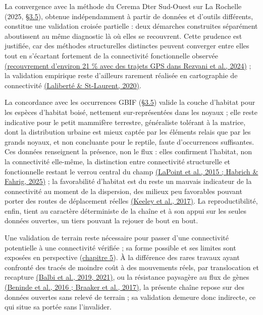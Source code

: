 \documentclass[a4paper,11pt]{report}
\begin{document}
La convergence avec la méthode du Cerema Dter Sud-Ouest sur La Rochelle (2025, \hyperref[sec:3.5]{§3.5}), obtenue indépendamment à partir de données et d'outils différents, constitue une validation croisée partielle : deux démarches construites séparément aboutissent au même diagnostic là où elles se recouvrent. Cette prudence est justifiée, car des méthodes structurelles distinctes peuvent converger entre elles tout en s'écartant fortement de la connectivité fonctionnelle observée \hyperref[sec:bibliographie]{(recouvrement d'environ 21 \% avec des trajets GPS dans Rezvani et al., 2024)} ; la validation empirique reste d'ailleurs rarement réalisée en cartographie de connectivité \hyperref[sec:bibliographie]{(Laliberté \& St-Laurent, 2020)}.

La concordance avec les occurrences GBIF (\hyperref[sec:3.5]{§3.5}) valide la couche d'habitat pour les espèces d'habitat boisé, nettement sur-représentées dans les noyaux ; elle reste indicative pour le petit mammifère terrestre, généraliste tolérant à la matrice, dont la distribution urbaine est mieux captée par les éléments relais que par les grands noyaux, et non concluante pour le reptile, faute d'occurrences suffisantes. Ces données renseignent la présence, non le flux : elles confirment l'habitat, non la connectivité elle-même, la distinction entre connectivité structurelle et fonctionnelle restant le verrou central du champ \hyperref[sec:bibliographie]{(LaPoint et al., 2015 ; Habrich \& Fahrig, 2025)} ; la favorabilité d'habitat est du reste un mauvais indicateur de la connectivité au moment de la dispersion, des milieux peu favorables pouvant porter des routes de déplacement réelles \hyperref[sec:bibliographie]{(Keeley et al., 2017)}. La reproductibilité, enfin, tient au caractère déterministe de la chaîne et à son appui sur les seules données ouvertes, un tiers pouvant la rejouer de bout en bout.

Une validation de terrain reste nécessaire pour passer d'une connectivité potentielle à une connectivité vérifiée ; sa forme possible et ses limites sont exposées en perspective (\hyperref[chap:5]{chapitre 5}). À la différence des rares travaux ayant confronté des tracés de moindre coût à des mouvements réels, par translocation et recapture \hyperref[sec:bibliographie]{(Balbi et al., 2019, 2021)}, ou la résistance paysagère au flux de gènes \hyperref[sec:bibliographie]{(Beninde et al., 2016 ; Braaker et al., 2017)}, la présente chaîne repose sur des données ouvertes sans relevé de terrain ; sa validation demeure donc indirecte, ce qui situe sa portée sans l'invalider.
\end{document}
